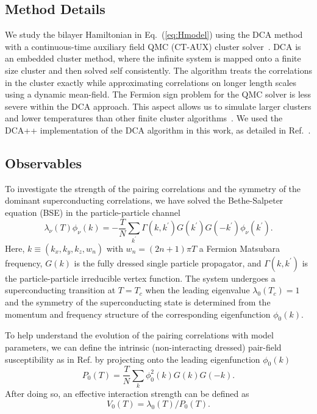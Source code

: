 \documentclass[prb,twocolumn,amsmath,amssymb,superscriptaddress,floatfix,nofootinbib]{revtex4-2}
\begin{document}
\subsection{Method Details}
We study the bilayer Hamiltonian in Eq.~(\ref{eq:Hmodel}) using the DCA method~\cite{Jarrell2001, Maier_Review} with a 
continuous-time auxiliary field QMC (CT-AUX) cluster solver~\cite{Gull_2008, Gull2011}.   
DCA is an embedded cluster method, where the infinite system is mapped onto a finite size cluster and then solved self consistently. The algorithm treats the correlations in the cluster exactly while approximating correlations on longer length scales using a dynamic mean-field. The Fermion sign problem for the QMC solver is less severe within the DCA approach. This aspect allows us to simulate larger clusters and lower temperatures than other finite cluster algorithms~\cite{Jarrell2001}. We used the DCA++ implementation of the DCA algorithm in this work, 
as detailed in Ref.~. 

\subsection{Observables}
To investigate the strength of the pairing correlations and the symmetry of the dominant superconducting correlations, we have solved the Bethe-Salpeter equation (BSE) in the particle-particle channel \cite{Maier2006}
\begin{equation}
    \lambda_\nu(T) \phi_\nu(k) = - \frac{T}{N} \sum_{k^\prime} \Gamma(k,k^\prime) G(k^\prime) G(-k^\prime) \phi_\nu(k^\prime).
    \label{eq:BSEeq}
\end{equation}
Here, $k\equiv(k_x,k_y,k_z,w_n)$ with $w_n=(2n+1)\pi T$ a Fermion Matsubara frequency, $G(k)$ is the fully dressed single particle propagator, and $\Gamma(k,k^\prime)$ is the particle-particle irreducible vertex function. The system undergoes a superconducting transition at $T=T_c$ when the leading eigenvalue $\lambda_0(T_c) = 1$ and the symmetry of the superconducting state is determined from the momentum and frequency structure of the corresponding eigenfunction $\phi_0(k)$.

To help understand the evolution of the pairing correlations with model parameters, we can define the intrinsic (non-interacting dressed) pair-field susceptibility as in Ref.  
by projecting onto the leading eigenfunction $\phi_0(k)$ 
\begin{equation}\label{eq:P0}
    P_0(T) = \frac{T}{N} \sum_k \phi_0^2(k) G(k) G(-k).
\end{equation}
After doing so, an effective interaction strength can be defined as 
\begin{equation}\label{eq:V}
    V_0(T) = \lambda_0(T)/P_0(T).
\end{equation}
\end{document}
